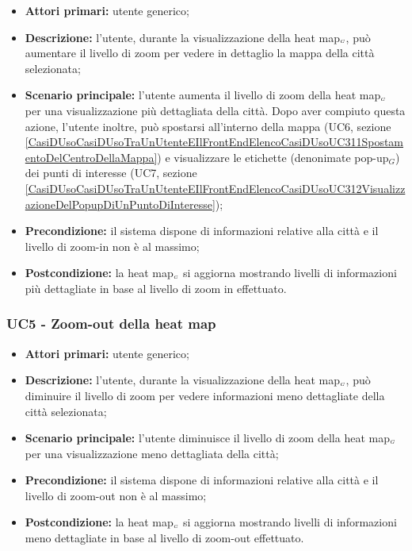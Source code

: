 \begin{itemize}
	\item \textbf{Attori primari:} utente generico;
	\item \textbf{Descrizione:} l’utente, durante la visualizzazione della heat map$_{\scaleto{G}{3pt}}$, può aumentare il livello di zoom per vedere in dettaglio la mappa della città selezionata;
	\item \textbf{Scenario principale:} l’utente aumenta il livello di zoom della heat map$_{\scaleto{G}{3pt}}$ per una visualizzazione più dettagliata della città. Dopo aver compiuto questa azione, l'utente inoltre, può spostarsi all'interno della mappa (UC6, sezione \ref{CasiDUsoCasiDUsoTraUnUtenteEIlFrontEndElencoCasiDUsoUC311SpostamentoDelCentroDellaMappa}) e visualizzare le etichette (denonimate pop-up$_G$) dei punti di interesse (UC7, sezione \ref{CasiDUsoCasiDUsoTraUnUtenteEIlFrontEndElencoCasiDUsoUC312VisualizzazioneDelPopupDiUnPuntoDiInteresse});
	\item \textbf{Precondizione:} il sistema dispone di informazioni relative alla città e il livello di zoom-in non è al massimo;
	\item \textbf{Postcondizione:} la heat map$_{\scaleto{G}{3pt}}$ si aggiorna mostrando livelli di informazioni più dettagliate in base al livello di zoom in effettuato.
\end{itemize}

\subsubsection{UC5 - Zoom-out della heat map}\label{CasiDUsoCasiDUsoTraUnUtenteEIlFrontEndElencoCasiDUsoUC32ZoomOutDellaHeatMap}

\begin{itemize}
	\item \textbf{Attori primari:} utente generico;
	\item \textbf{Descrizione:} l’utente, durante la visualizzazione della heat map$_{\scaleto{G}{3pt}}$, può diminuire il livello di zoom per vedere informazioni meno dettagliate della città selezionata;
	\item \textbf{Scenario principale:} l’utente diminuisce il livello di zoom della heat map$_{\scaleto{G}{3pt}}$ per una visualizzazione meno dettagliata della città;
	\item \textbf{Precondizione:}  il sistema dispone di informazioni relative alla città e il livello di zoom-out non è al massimo;
	\item \textbf{Postcondizione:} la heat map$_{\scaleto{G}{3pt}}$ si aggiorna mostrando livelli di informazioni meno dettagliate in base al livello di zoom-out effettuato.
\end{itemize}

